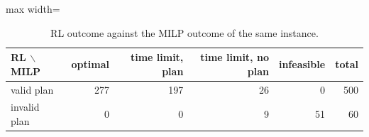 \begin{table}[H]\centering
\caption{RL outcome against the MILP outcome of the same instance.}\label{tab:crosstab}
\begin{adjustbox}{max width=\textwidth}\begin{tabular}{lrrrrr}\toprule
RL $\backslash$ MILP & optimal & time limit, plan & time limit, no plan & infeasible & total \\ \midrule
valid plan & 277 & 197 & 26 & 0 & 500 \\
invalid plan & 0 & 0 & 9 & 51 & 60 \\
\bottomrule\end{tabular}\end{adjustbox}\end{table}
